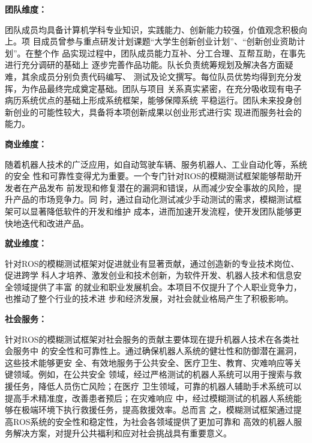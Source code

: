 \textbf{团队维度：}
  
团队成员均具备计算机学科专业知识，实践能力、创新能力较强，价值观念积极向上。项
目成员曾参与重点研发计划课题“大学生创新创业计划”、“创新创业资助计划”。在整个作
品实现过程中，团队成员能力互补、分工合理、互帮互助，在事先进行充分调研的基础上
逐步完善作品功能。队长负责统筹规划及解决各方面疑难，其余成员分别负责代码编写、
测试及论文撰写。每位队员优势均得到充分发挥，为作品最终完成奠定基础。团队与项目
关系真实紧密，在充分吸收现有电子病历系统优点的基础上形成系统框架，能够保障系统
平稳运行。团队未来投身创新创业的可能性较大，具备将本项创新成果以创业形式进行实
现进而服务社会的能力。
  
\textbf{商业维度：}
  
随着机器人技术的广泛应用，如自动驾驶车辆、服务机器人、工业自动化等，系统的安全
性和可靠性变得尤为重要。一个专门针对ROS的模糊测试框架能够帮助开发者在产品发布
前发现和修复潜在的漏洞和错误，从而减少安全事故的风险，提升产品的市场竞争力。同
时，通过自动化测试减少手动测试的需求，模糊测试框架可以显著降低软件的开发和维护
成本，进而加速开发流程，使开发团队能够更快地迭代和改进产品。
  
\textbf{就业维度：}
  
针对ROS的模糊测试框架对促进就业有显著贡献，通过创造新的专业技术岗位、促进跨学
科人才培养、激发创业和技术创新，为软件开发、机器人技术和信息安全领域提供了丰富
的就业和职业发展机会。本项目不仅提升了个人职业竞争力，也推动了整个行业的技术进
步和经济发展，对社会就业格局产生了积极影响。
  
\textbf{社会服务：}
  
针对ROS的模糊测试框架对社会服务的贡献主要体现在提升机器人技术在各类社会服务中
的安全性和可靠性上。通过确保机器人系统的健壮性和防御潜在漏洞，这些技术能够更安
全、有效地服务于公共安全、医疗卫生、教育、灾难响应等关键领域。例如，在公共安全
领域，经过严格测试的机器人系统可以用于搜索与救援任务，降低人员伤亡风险；在医疗
卫生领域，可靠的机器人辅助手术系统可以提高手术精准度，改善患者预后；在灾难响应
中，经过模糊测试的机器人系统能够在极端环境下执行救援任务，提高救援效率。总而言
之，模糊测试框架通过提高ROS系统的安全性和稳定性，为社会各领域提供了更加可靠和
高效的机器人服务解决方案，对提升公共福利和应对社会挑战具有重要意义。

